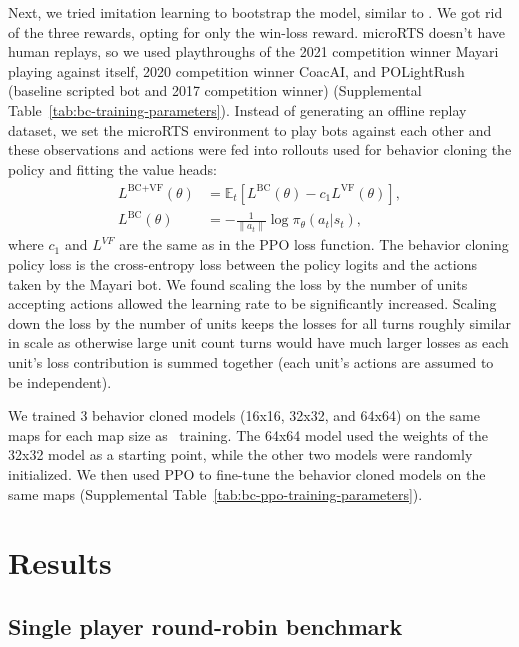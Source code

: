 \documentclass[conference]{IEEEtran}
\begin{document}
Next, we tried imitation learning to bootstrap the model, similar to
\cite{Vinyals2019GrandmasterLI}. We got rid of the three rewards, opting for only the
win-loss reward. microRTS doesn't have human replays, so we used playthroughs of the
2021 competition winner Mayari playing against itself, 2020 competition winner CoacAI, 
and POLightRush (baseline scripted bot and 2017 competition winner) (Supplemental Table~\ref{tab:bc-training-parameters}). Instead of
generating an offline replay dataset, we set the microRTS environment to play bots
against each other and these observations and actions were fed into rollouts used for
behavior cloning the policy and fitting the value heads:
\begin{align}
    L^{\text{BC+VF}}(\theta) &= \hat{\mathbb{E}}_t \left[ L^{\text{BC}}(\theta) - c_1 L^{\text{VF}}(\theta) \right], \\
    L^{\text{BC}}(\theta) &= -\frac{1}{\|a_t\|} \log \pi_{\theta}(a_t|s_t),
\end{align}
where $c_1$ and $L^{VF}$ are the same as in the PPO loss function. The behavior cloning
policy loss is the cross-entropy loss between the policy logits and the actions taken by
the Mayari bot. We found scaling the loss by the number of units accepting actions
allowed the learning rate to be significantly increased. Scaling down the loss by the
number of units keeps the losses for all turns roughly similar in scale as otherwise
large unit count turns would have much larger losses as each unit's loss contribution is
summed together (each unit's actions are assumed to be independent).

We trained 3 behavior cloned models (16x16, 32x32, and 64x64) on the same maps for each
map size as \agentName\ training. The 64x64 model used the weights of the 32x32 model 
as a starting point, while the other two models were randomly initialized. We then used 
PPO to fine-tune the behavior cloned models on the same maps (Supplemental Table~\ref{tab:bc-ppo-training-parameters}).

\section{Results}
\subsection{Single player round-robin benchmark}
\label{sec:single-player-benchmark}
\end{document}
